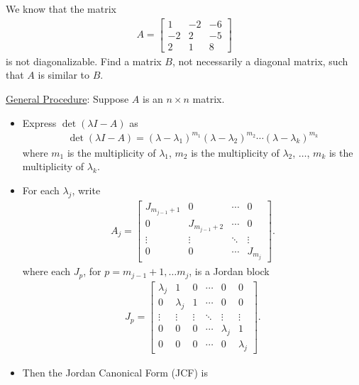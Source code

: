\documentclass[12pt,a4paper]{article}
\newcounter{example}[section]
\begin{document}
	\begin{example}
	We know that the matrix
		\begin{align*}
		A = \begin{bmatrix}
		1 & -2 & -6 \\ -2 & 2 & -5 \\ 2 & 1 & 8
		\end{bmatrix}
		\end{align*}
	is not diagonalizable. Find a matrix $B$, not necessarily a diagonal matrix, such that $A$ is similar to $B$.
	\end{example}
	
	\newpage
	
	\underline{General Procedure}: Suppose $A$ is an $n \times n$ matrix.
	\begin{itemize}
	\item Express $\det (\lambda I - A )$ as
		\begin{align*}
		\det (\lambda I - A) = (\lambda - \lambda_1)^{m_1} (\lambda - \lambda_2 )^{m_2} \cdots (\lambda - \lambda_k)^{m_k}
		\end{align*}
	where $m_1$ is the multiplicity of $\lambda_1$, $m_2$ is the multiplicity of $\lambda_2$, $\ldots$, $m_k$ is the multiplicity of $\lambda_k$.
	\item For each $\lambda_j$, write
		\begin{align*}
		A_{j} = \begin{bmatrix}
		J_{m_{j-1} + 1} & 0 & \cdots & 0 \\
		0 & J_{m_{j - 1} + 2} & \cdots & 0 \\
		\vdots & \vdots & \ddots & \vdots \\
		0 & 0 & \cdots & J_{m_j}
		\end{bmatrix} .
		\end{align*}
	where each $J_p$, for $p = m_{j-1} + 1, \ldots m_j$, is a Jordan block
		\begin{align*}
		J_p = \begin{bmatrix}
		\lambda_j & 1 & 0 & \cdots & 0 & 0 \\
		0 & \lambda_j & 1 & \cdots & 0 & 0 \\
		\vdots & \vdots & \vdots & \ddots & \vdots & \vdots \\
		0 & 0 & 0 & \cdots & \lambda_j & 1 \\
		0 & 0 & 0 & \cdots & 0 & \lambda_j
		\end{bmatrix} .
		\end{align*}
	\item Then the Jordan Canonical Form (JCF) is

\end{itemize}
\end{document}
